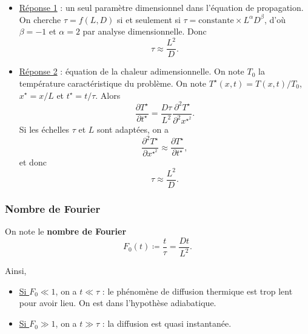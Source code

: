         \begin{itemize}
            \item \underline{Réponse 1} : un seul paramètre dimensionnel dans l'équation de propagation. On cherche $\tau=f(L,D)$ si et seulement si $\tau=\mathrm{constante}\times L^{\alpha}D^{\beta}$, d'où $\beta=-1$ et $\alpha=2$ par analyse dimensionnelle. Donc
            \begin{equation}
                \boxed{
                    \tau\approx\frac{L^{2}}{D}.
                }
            \end{equation}

            \item \underline{Réponse 2} : équation de la chaleur adimensionnelle. On note $T_0$ la température caractéristique du problème. On note $T^{\star}(x,t)=T(x,t)/T_0$, $x^{\star}=x/L$ et $t^{\star}=t/\tau$. Alors
            \begin{equation}
                \frac{\partial T^{\star}}{\partial t^{\star}}=\frac{D\tau}{L^{2}}\frac{\partial^{2}T^{\star}}{\partial^{2}x^{{\star}^{2}}}.
            \end{equation}
            Si les échelles $\tau$ et $L$ sont adaptées, on a 
            \begin{equation}
                \frac{\partial^{2}T^{\star}}{\partial x^{{\star}^{2}}}\approx\frac{\partial T^{\star}}{\partial t^{\star}},
            \end{equation}
            et donc 
            \begin{equation}
                \boxed{
                    \tau\approx\frac{L^{2}}{D}.
                }
            \end{equation}
        \end{itemize}

        \subsubsection{Nombre de Fourier}
            On note le \textbf{nombre de Fourier}
            \begin{equation}
                F_0(t)\coloneqq\frac{t}{\tau}=\frac{Dt}{L^{2}}.
            \end{equation}

            Ainsi,
            \begin{itemize}
                \item \underline{Si $F_0\ll1$}, on a $t\ll\tau$ : le phénomène de diffusion thermique est trop lent pour avoir lieu. On est dans l'hypothèse adiabatique.
                \item \underline{Si $F_0\gg1$}, on a $t\gg\tau$ : la diffusion est quasi instantanée.
            \end{itemize}

